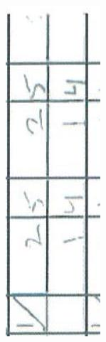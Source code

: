 \documentclass[10pt]{article}
\begin{document}
\includegraphics[max width=\textwidth, center]{2025_02_27_dd68c3d38de88f0516d9g-019(1)}\\
\end{document}
